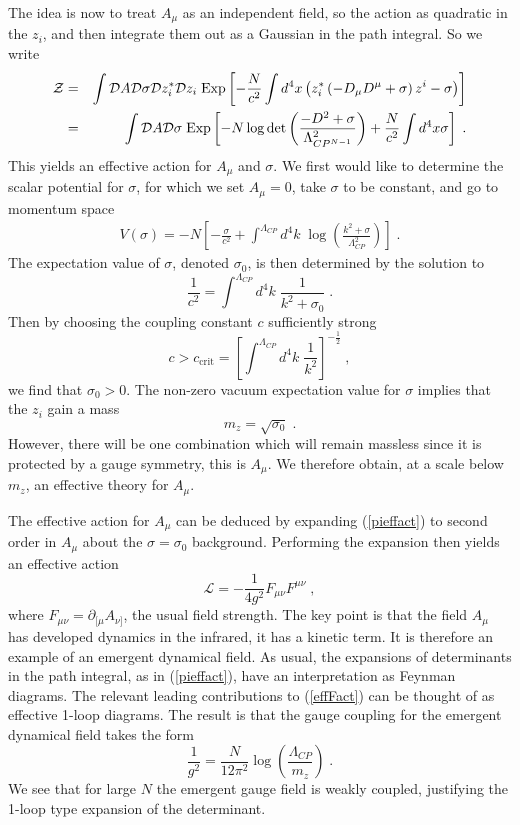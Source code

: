 \documentclass[11pt,a4paper]{article}
\numberwithin{equation}{section}
\numberwithin{table}{section}\setlength{\multlinegap}{25pt}
\newcommand{\bea}{\begin{eqnarray}}  \newcommand{\eea}{\end{eqnarray}}
\newcommand{\nn}{\nonumber}
\newcommand{\cD}{\mathcal{D}}
\newcommand{\cL}{\mathcal{L}}
\newcommand{\be}{\begin{equation}}
\newcommand{\ee}{\end{equation}}
\begin{document}
{The idea is now to treat $A_{\mu}$ as an independent field, so the action as quadratic in the $z_i$, and then integrate them out as a Gaussian in the path integral. So we write
\bea
{\cal Z} &=& \int \cD A \cD \sigma \cD z_i^* \cD z_i \;\mathrm{Exp}\left[-\frac{N}{c^2} \int d^4x \left( z_i^* \left(-D_{\mu} D^{\mu} + \sigma \right) z^i - \sigma\right) \right] \nn \\
&=& \int \cD A \cD \sigma \; \mathrm{Exp}\left[ -N \log \det \left( \frac{- D^2 + \sigma}{\Lambda_{CP^{N-1}}^2}\right) +\frac{N}{c^2} \int d^4x \sigma \right] \;.
\label{pieffact}
\eea
This yields an effective action for $A_{\mu}$ and $\sigma$. We first would like to determine the scalar potential for $\sigma$, for which we set $A_{\mu} =0$, take $\sigma$ to be constant, and go to momentum space
\bea
V\left(\sigma \right) = -N\left[ -\frac{\sigma}{c^2} + \int^{\Lambda_{CP}} d^4k \;\log \left( \frac{k^2+\sigma}{\Lambda^2_{CP}}\right) \right]\;.
\eea
The expectation value of $\sigma$, denoted $\sigma_0$, is then determined by the solution to
\be
\frac{1}{c^2} = \int^{\Lambda_{CP}} d^4k \; \frac{1}{k^2 + \sigma_0} \;.
\ee
Then by choosing the coupling constant $c$ sufficiently strong
\be
c > c_{\mathrm{crit}} = \left[ \int^{\Lambda_{CP}} d^4k \; \frac{1}{k^2} \right]^{-\frac12} \;,
\ee
we find that $\sigma_0 > 0$. The non-zero vacuum expectation value for $\sigma$ implies that the $z_i$ gain a mass
\be
m_z = \sqrt{\sigma_0}\;.
\ee
However, there will be one combination which will remain massless since it is protected by a gauge symmetry, this is $A_{\mu}$. We therefore obtain, at a scale below $m_z$, an effective theory for $A_{\mu}$.

The effective action for $A_{\mu}$ can be deduced by expanding (\ref{pieffact}) to second order in $A_{\mu}$ about the $\sigma=\sigma_0$ background. Performing the expansion then yields an effective action 
\be
\cL = -\frac{1}{4g^2} F_{\mu\nu} F^{\mu\nu} \;,
\label{effFact}
\ee
where $F_{\mu\nu}=\partial_{[\mu}A_{\nu]}$, the usual field strength. The key point is that the field $A_{\mu}$ has developed dynamics in the infrared, it has a kinetic term. It is therefore an example of an emergent dynamical field. As usual, the expansions of determinants in the path integral, as in (\ref{pieffact}), have an interpretation as Feynman diagrams. The relevant leading contributions to (\ref{effFact}) can be thought of as effective 1-loop diagrams. The result is that the gauge coupling for the emergent dynamical field takes the form
\be
\frac{1}{g^2} = \frac{N}{12 \pi^2} \log \left( \frac{\Lambda_{CP}}{m_z}\right) \;.
\label{cpnemrg}
\ee
We see that for large $N$ the emergent gauge field is weakly coupled, justifying the 1-loop type expansion of the determinant. 

}
\end{document}
